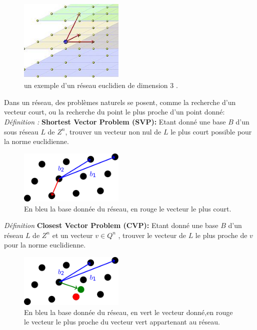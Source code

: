 \documentclass[a4paper,12pt]{article}
\begin{document}
\begin{figure}[h!]\begin{center}
    \includegraphics[width=5cm]{reseau.jpg}
    \caption{un exemple d'un réseau euclidien de dimension 3 .}
    \label{fig:reseau}
  \end{center}
  \end{figure}
Dans un réseau, des problèmes naturels se posent, comme la recherche d’un vecteur court, ou la recherche du point le plus proche d’un point donné: \newline
\textit{Définition :} \textbf{Shortest Vector Problem (SVP):}\newline
Etant donné une base $B$ d’un sous réseau $L$ de $Z^n$, trouver un vecteur non nul de $L$ le plus court possible pour la norme euclidienne.\newline
\newline
\newline
\begin{figure}[h!]\begin{center}
    \includegraphics[width=5cm]{svp.png}
    \caption{En bleu la base donnée du réseau, en rouge le vecteur le plus court.}
    \label{fig:svp}
  \end{center}
  \end{figure}
  \newpage
\textit{Définition} \textbf{Closest Vector Problem (CVP):}\newline
Etant donné une base $B$ d’un réseau $L$ de $Z^n$ et un vecteur $v \in Q^n$ , trouver le vecteur de $L$ le plus proche de $v$ pour la norme euclidienne.\newline
\newline
\newline
\begin{figure}[h!]\begin{center}
    \includegraphics[width=5cm]{cvp.png}
    \caption{En bleu la base donnée du réseau, en vert le vecteur donné,en rouge le vecteur le plus proche du vecteur vert appartenant au réseau.}
    \label{fig:cvp}
  \end{center}
  \end{figure}
\end{document}
